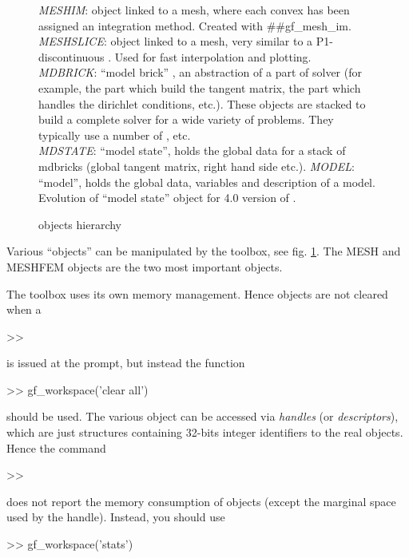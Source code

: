 \begin{figure}
\begin{center}
\begin{minipage}[c]{12cm}
  \textit{MESHIM}: object linked to a mesh, where each convex has been
  assigned an integration method. Created with  ##gf\_mesh\_im.\\
  \textit{MESHSLICE}: object linked to a mesh, very similar to a P1-discontinuous \mf. Used for fast interpolation and plotting.\\
   \textit{MDBRICK}: ``model brick'' , an abstraction of a part of solver (for example, the part which build the tangent matrix, the part which handles the dirichlet conditions, etc.). These objects are stacked to build a complete solver for a wide variety of problems. They typically use a number of \mf, \mim etc.\\
   \textit{MDSTATE}: ``model state'', holds the global data for a stack of mdbricks (global tangent matrix, right hand side etc.). 
   \textit{MODEL}: ``model'', holds the global data, variables and description of a model. Evolution of ``model state'' object for 4.0 version of \gf.
\T \end{minipage}
\T \end{center}
\caption{\Gfi objects hierarchy}\label{fig:hierarchy}
\end{figure}
Various ``objects'' can be manipulated by the \gfm toolbox, see fig. \ref{fig:hierarchy}. The MESH and MESHFEM objects are the two most important objects. 

The \gfm toolbox uses its own memory management. Hence \gf objects are
not cleared when a 
\begin{matlab}
>> 
\end{matlab}
is issued at the \mlab prompt, but
instead the function 
\begin{matlab}
>> gf\_workspace('clear all')
\end{matlab}
should be used. The various \gfm object can be accessed via \textit{handles} (or
\textit{descriptors}), which are just \mlab structures containing 32-bits integer identifiers to
the real objects. Hence the \mlab command 
\begin{matlab}
>> 
\end{matlab}
does not report the memory consumption of \gf objects (except the marginal space
 used by the handle). Instead, you should use
\begin{matlab}
>> gf\_workspace('stats')
\end{matlab}

